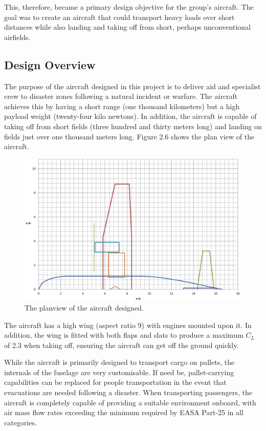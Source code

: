 \documentclass[stu, a4paper, 12pt, floatsintext]{apa7}
\numberwithin{figure}{section}
\numberwithin{table}{section}
\numberwithin{equation}{section}
\begin{document}
This, therefore, became a primary design objective for the group’s aircraft. The goal was to create an aircraft that could transport heavy loads over short distances while also landing and taking off from short, perhaps unconventional airfields.  


\subsection{Design Overview}

The purpose of the aircraft designed in this project is to deliver aid and specialist crew to disaster zones following a natural incident or warfare. The aircraft achieves this by having a short range (one thousand kilometers) but a high payload weight (twenty-four kilo newtons). In addition, the aircraft is capable of taking off from short fields (three hundred and thirty meters long) and landing on fields just over one thousand meters long.  Figure 2.6 shows the plan view of the aircraft.

\begin{figure}[H]
    \caption{The planview of the aircraft designed.}
    \label{fig:aircraft_planview}
    \centering
    \includegraphics[width=1.1\textwidth]{pictures/planview.jpg}
\end{figure}

The aircraft has a high wing (aspect ratio 9) with engines mounted upon it. In addition, the wing is fitted with both flaps and slats to produce a maximum $C_L$ of 2.3 when taking off, ensuring the aircraft can get off the ground quickly. 

While the aircraft is primarily designed to transport cargo on pallets, the internals of the fuselage are very customisable. If need be, pallet-carrying capabilities can be replaced for people transportation in the event that evacuations are needed following a disaster. When transporting passengers, the aircraft is completely capable of providing a suitable environment onboard, with air mass flow rates exceeding the minimum required by EASA Part-25 in all categories. 
\end{document}
